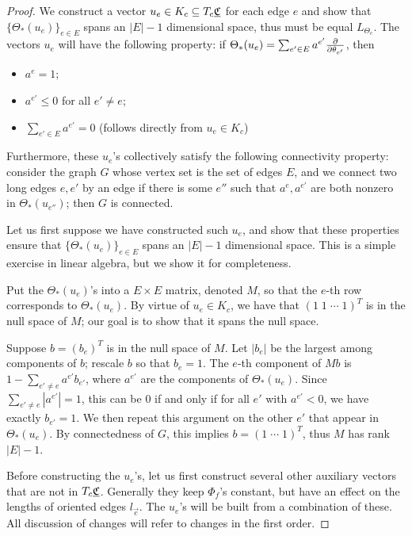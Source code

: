 \begin{proof}
We construct a vector $u_e \in K_c \subseteq T_c {\underline{\mathfrak{C}}}$ for each edge $e$
and show that $\{\Theta_*(u_e)\}_{e\in E}$ spans an
$|E|-1$ dimensional space,
thus must be equal $L_{\Theta_c}$.
The vectors $u_e$ will have the following property:
if $\Theta_*(u_e) = \sum_{e' \in E} a^{e'} {\frac{\partial}{\partial \theta_{e'}}}$, then
\begin{itemize}
	\item $a^e = 1$;
	\item $a^{e'} \leq 0$ for all $e' \neq e$;
	\item $\sum_{e' \in E} a^{e'} = 0$ (follows directly from $u_e \in K_c$)
\end{itemize}

Furthermore, these $u_e$'s collectively satisfy the following
connectivity property:
consider the graph $G$ whose vertex set is the set of edges $E$,
and we connect two long edges $e,e'$ by an edge if there is some $e''$ such that
$a^e, a^{e'}$ are both nonzero in $\Theta_*(u_{e''})$;
then $G$ is connected.


Let us first suppose we have constructed such $u_e$,
and show that these properties ensure that
$\{\Theta_*(u_e)\}_{e\in E}$ spans an $|E|-1$ dimensional space.
This is a simple exercise in linear algebra,
but we show it for completeness.


Put the $\Theta_*(u_e)$'s into a $E \times E$ matrix,
denoted $M$,
so that the $e$-th row corresponds to $\Theta_*(u_e)$.
By virtue of $u_e \in K_c$, we have that $(1\; 1\; \cdots \; 1)^T$
is in the null space of $M$;
our goal is to show that it spans the null space.


Suppose $b = (b_e)^T$ is in the null space of $M$.
Let $|b_e|$ be the largest among components of $b$;
rescale $b$ so that $b_e = 1$.
The $e$-th component of $M b$
is $1 - \sum_{e' \neq e} a^{e'} b_{e'}$,
where $a^{e'}$ are the components of $\Theta_*(u_e)$.
Since $\sum_{e' \neq e} |a^{e'}| = 1$, this can be 0 if and only if
for all $e'$ with $a^{e'} < 0$, we have exactly $b_{e'} = 1$.
We then repeat this argument on the other $e'$
that appear in $\Theta_*(u_e)$.
By connectedness of $G$, this implies
$b = (1 \; \cdots \; 1)^T$,
thus $M$ has rank $|E|-1$.


Before constructing the $u_e$'s,
let us first construct several other auxiliary vectors
that are not in $T_c {\underline{\mathfrak{C}}}$.
Generally they keep $\Phi_f$'s constant,
but have an effect on the lengths of oriented edges $l_{\vec{e}}$.
The $u_e$'s will be built from a combination of these.
All discussion of changes will refer to changes in the first order.



\end{proof}
